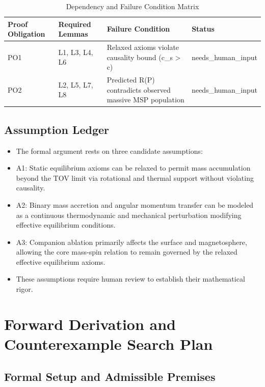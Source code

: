 \documentclass[conference]{IEEEtran}
\begin{document}
\begin{table}[htbp]
\centering
\footnotesize
\setlength{\tabcolsep}{3pt}
\renewcommand{\arraystretch}{1.12}
\caption{Dependency and Failure Condition Matrix}
\label{tab:definitions-and-propositions-def-table-dependency}
\begin{tabular}{|p{}|p{}|p{}|p{}|}
\hline
Proof Obligation & Required Lemmas & Failure Condition & Status \\\hline
PO1 & L1, L3, L4, L6 & Relaxed axioms violate causality bound (c\_s > c) & needs\_human\_input \\\hline
PO2 & L2, L5, L7, L8 & Predicted R(P) contradicts observed massive MSP population & needs\_human\_input \\\hline
\end{tabular}
\end{table}

\subsection{Assumption Ledger}
\begin{itemize}
\item The formal argument rests on three candidate assumptions:
\item A1: Static equilibrium axioms can be relaxed to permit mass accumulation beyond the TOV limit via rotational and thermal support without violating causality.
\item A2: Binary mass accretion and angular momentum transfer can be modeled as a continuous thermodynamic and mechanical perturbation modifying effective equilibrium conditions.
\item A3: Companion ablation primarily affects the surface and magnetosphere, allowing the core mass-spin relation to remain governed by the relaxed effective equilibrium axioms.
\item These assumptions require human review to establish their mathematical rigor.
\end{itemize}

\section{Forward Derivation and Counterexample Search Plan}
\subsection{Formal Setup and Admissible Premises}
\end{document}
